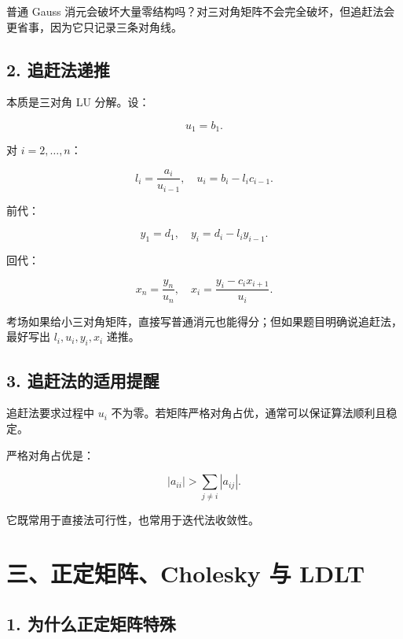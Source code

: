 \documentclass[11pt,a4paper]{ctexart}
\begin{document}
普通 Gauss 消元会破坏大量零结构吗？对三对角矩阵不会完全破坏，但追赶法会更省事，因为它只记录三条对角线。


\subsection*{2. 追赶法递推}


本质是三对角 LU 分解。设：

\[
u_1=b_1.
\]

对 $i=2,\ldots,n$：

\[
l_i=\frac{a_i}{u_{i-1}},\quad u_i=b_i-l_i c_{i-1}.
\]

前代：

\[
y_1=d_1,\quad y_i=d_i-l_i y_{i-1}.
\]

回代：

\[
x_n=\frac{y_n}{u_n},\quad
x_i=\frac{y_i-c_i x_{i+1}}{u_i}.
\]

考场如果给小三对角矩阵，直接写普通消元也能得分；但如果题目明确说追赶法，最好写出 $l_i,u_i,y_i,x_i$ 递推。


\subsection*{3. 追赶法的适用提醒}


追赶法要求过程中 $u_i$ 不为零。若矩阵严格对角占优，通常可以保证算法顺利且稳定。

严格对角占优是：

\[
|a_{ii}|>\sum_{j\ne i}|a_{ij}|.
\]

它既常用于直接法可行性，也常用于迭代法收敛性。


\section*{三、正定矩阵、Cholesky 与 LDLT}



\subsection*{1. 为什么正定矩阵特殊}
\end{document}
